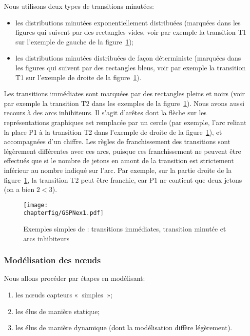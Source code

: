 Nous utilisons deux types de transitions minutées:
\begin{itemize}
    \item les distributions minutées exponentiellement distribuées (marquées dans les figures qui suivent par des rectangles vides, voir par exemple la transition \textsf{T1} sur l'exemple de gauche de la figure~\ref{sa:fig:gspnex1});
    \item les distributions minutées distribuées de façon déterministe (marquées dans les figures qui suivent par des rectangles bleus, voir par exemple la transition \textsf{T1} sur l'exemple de droite de la figure~\ref{sa:fig:gspnex1}).
\end{itemize}
Les transitions immédiates sont marquées par des rectangles pleins et noirs (voir par exemple la transition \textsf{T2} dans les exemples de la figure~\ref{sa:fig:gspnex1}).
Nous avons aussi recours à des arcs inhibiteurs.
Il s'agit d'arêtes dont la flèche sur les représentations graphiques est remplacée par un cercle (par exemple, l'arc reliant la place \textsf{P1} à la transition \textsf{T2} dans l'exemple de droite de la figure~\ref{sa:fig:gspnex1}), et accompagnées d'un chiffre.
Les règles de franchissement des transitions sont légèrement différentes avec ces arcs, puisque ces franchissement ne peuvent être effectués que si le nombre de jetons en amont de la transition est strictement inférieur au nombre indiqué sur l'arc.
Par exemple, sur la partie droite de la figure~\ref{sa:fig:gspnex1}, la transition \textsf{T2} peut être franchie, car \textsf{P1} ne contient que deux jetons (on a bien $2<3$).
\begin{figure}[H]
    \centering
    \texttt{[image: \\chapterfig/GSPNex1.pdf]}
    \caption{Exemples simples de \rpsge: transitions immédiates, transition minutée et arcs inhibiteurs}\label{sa:fig:gspnex1}
\end{figure}

        \subsubsection{Modélisation des nœuds}
Nous allons procéder par étapes en modélisant:
\begin{enumerate}
    \item les nœuds capteurs «~simples~»;
    \item les \cns élus de manière statique;
    \item les \cns élus de manière dynamique (dont la modélisation diffère légèrement).
\end{enumerate}

